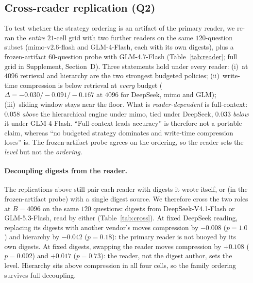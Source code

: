 \documentclass{article} %
\begin{document}
\subsection{Cross-reader replication (Q2)}
\label{sec:crossreader}
To test whether the strategy ordering is an artifact of the primary reader, we re-ran the
\emph{entire} $21$-cell grid with two further readers on the same $120$-question subset
(mimo-v2.6-flash and GLM-4-Flash, each with its own digests), plus a frozen-artifact
$60$-question probe with GLM-4.7-Flash (Table~\ref{tab:reader}; full grid in
Supplement, Section~D). Three statements hold under every reader: (i)~at $4096$
retrieval and hierarchy are the two strongest budgeted policies; (ii)~write-time
compression is below retrieval at \emph{every} budget ($\Delta{=}-0.030/{-}0.091/{-}0.167$
at $4096$ for DeepSeek, mimo and GLM); (iii)~sliding window stays near the floor. What is
\emph{reader-dependent} is full-context: $0.058$ \emph{above} the hierarchical engine under
mimo, tied under DeepSeek, $0.033$ \emph{below} it under GLM-4-Flash. ``Full-context leads
accuracy'' is therefore not a portable claim, whereas ``no budgeted strategy dominates and
write-time compression loses'' is. The frozen-artifact probe agrees on the ordering, so the
reader sets the \emph{level} but not the \emph{ordering}.

\paragraph{Decoupling digests from the reader.} The replications above still pair each reader
with digests it wrote itself, or (in the frozen-artifact probe) with a single digest source. We
therefore cross the two roles at $B{=}4096$ on the same $120$ questions: digests from
DeepSeek-V4.1-Flash or GLM-5.3-Flash, read by either (Table~\ref{tab:cross}). At fixed
DeepSeek reading, replacing its digests with another vendor's moves compression by $-0.008$
($p{=}1.0$) and hierarchy by $-0.042$ ($p{=}0.18$): the primary reader is not buoyed by its own
digests. At fixed digests, swapping the reader moves compression by $+0.108$ ($p{=}0.002$) and
$+0.017$ ($p{=}0.73$): the reader, not the digest author, sets the level. Hierarchy sits above
compression in all four cells, so the family ordering survives full decoupling.

\begin{table}[h]
\centering\scriptsize
\caption{Summarizer $\times$ reader decoupling at $B{=}4096$ (relaxed EM; stratified $120$
questions; each cell $n{=}120$). Rows are policies, columns the four digest-source $\times$
reader combinations; the diagonal cells (DS/DS, GLM/GLM) are the self-generated conditions.
All cells are paired on the same questions and rebuilt from the two frozen digest stores; the
DS/DS cell reproduces the archived main-grid assembly (identical footprints) to within two
questions of generation noise. Source \texttt{tables500/cross.tex}.}
\label{tab:cross}

\end{table}
\end{document}
